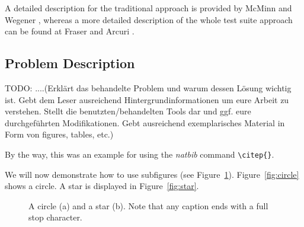 \documentclass[pdftex,english,oribibl]{llncs}
\begin{document}
A detailed description for the traditional approach is provided by McMinn \citep{mcminn2004search} and Wegener \citep{wegener2001evolutionary},  whereas a more detailed description of the whole test suite approach can be found at Fraser and Arcuri \citep{fraser2015achieving}.

\subsection{Problem Description} 


TODO:
....(Erklärt das behandelte Problem und warum dessen Lösung wichtig ist. Gebt dem Leser ausreichend Hintergrundinformationen um eure Arbeit zu verstehen. Stellt die benutzten/behandelten Tools dar und ggf. eure durchgeführten Modifikationen. Gebt ausreichend exemplarisches Material in Form von figures, tables, etc.)

By the way, this was an example for using the \textit{natbib} command \texttt{\textbackslash{}citep\{\}}.

  We will now demonstrate how to use subfigures (see Figure~\ref{fig:subfig}). Figure~\ref{fig:circle} shows a circle. A star is displayed in Figure~\ref{fig:star}.

  \begin{figure}
    \centering
    \caption{A circle (a) and a star (b). Note that any caption ends with a full stop character.}
    \label{fig:subfig}
  \end{figure}
\end{document}

